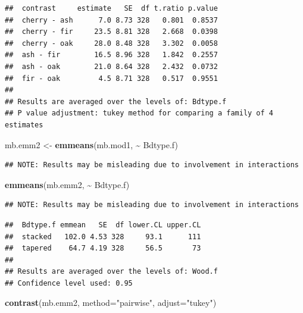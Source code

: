 \documentclass[
]{book}
\newenvironment{Shaded}{\begin{snugshade}}{\end{snugshade}}
\newcommand{\AttributeTok}[1]{\textcolor[rgb]{0.13,0.29,0.53}{#1}}
\newcommand{\FunctionTok}[1]{\textcolor[rgb]{0.13,0.29,0.53}{\textbf{#1}}}
\newcommand{\NormalTok}[1]{#1}
\newcommand{\OtherTok}[1]{\textcolor[rgb]{0.56,0.35,0.01}{#1}}
\newcommand{\SpecialCharTok}[1]{\textcolor[rgb]{0.81,0.36,0.00}{\textbf{#1}}}
\newcommand{\StringTok}[1]{\textcolor[rgb]{0.31,0.60,0.02}{#1}}
\begin{document}
\begin{verbatim}
##  contrast     estimate   SE  df t.ratio p.value
##  cherry - ash      7.0 8.73 328   0.801  0.8537
##  cherry - fir     23.5 8.81 328   2.668  0.0398
##  cherry - oak     28.0 8.48 328   3.302  0.0058
##  ash - fir        16.5 8.96 328   1.842  0.2557
##  ash - oak        21.0 8.64 328   2.432  0.0732
##  fir - oak         4.5 8.71 328   0.517  0.9551
## 
## Results are averaged over the levels of: Bdtype.f 
## P value adjustment: tukey method for comparing a family of 4 estimates
\end{verbatim}

\begin{Shaded}
\begin{Highlighting}[]
\NormalTok{mb.emm2 }\OtherTok{\textless{}{-}} \FunctionTok{emmeans}\NormalTok{(mb.mod1, }\SpecialCharTok{\textasciitilde{}}\NormalTok{ Bdtype.f)}
\end{Highlighting}
\end{Shaded}

\begin{verbatim}
## NOTE: Results may be misleading due to involvement in interactions
\end{verbatim}

\begin{Shaded}
\begin{Highlighting}[]
\FunctionTok{emmeans}\NormalTok{(mb.emm2, }\SpecialCharTok{\textasciitilde{}}\NormalTok{ Bdtype.f)}
\end{Highlighting}
\end{Shaded}

\begin{verbatim}
## NOTE: Results may be misleading due to involvement in interactions
\end{verbatim}

\begin{verbatim}
##  Bdtype.f emmean   SE  df lower.CL upper.CL
##  stacked   102.0 4.53 328     93.1      111
##  tapered    64.7 4.19 328     56.5       73
## 
## Results are averaged over the levels of: Wood.f 
## Confidence level used: 0.95
\end{verbatim}

\begin{Shaded}
\begin{Highlighting}[]
\FunctionTok{contrast}\NormalTok{(mb.emm2, }\AttributeTok{method=}\StringTok{"pairwise"}\NormalTok{, }\AttributeTok{adjust=}\StringTok{"tukey"}\NormalTok{)}
\end{Highlighting}
\end{Shaded}
\end{document}

